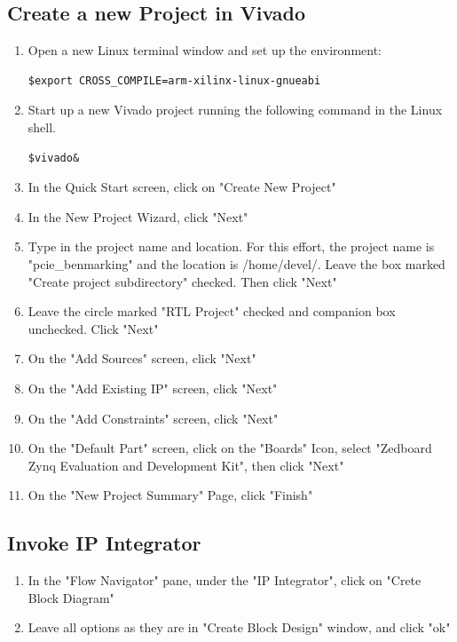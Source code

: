 \documentclass[12pt]{article}
\begin{document}
\subsection{Create a new Project in Vivado} \label{subsec:new project}
\begin{enumerate} 
\item Open a new Linux terminal window and set up the environment:
\begin{lstlisting}
$export CROSS_COMPILE=arm-xilinx-linux-gnueabi
\end{lstlisting}
\item Start up a new Vivado project running the following command in the Linux shell.

\begin{lstlisting}
$vivado&
\end{lstlisting}

\item In the Quick Start screen, click on "Create New Project"
\item In the New Project Wizard, click "Next"
\item Type in the project name and location.  For this effort, the project name is "pcie\_benmarking" and the location is /home/devel/.  Leave the box marked "Create project subdirectory" checked.  Then click "Next"\label{itm:project name}
\item Leave the circle marked "RTL Project" checked and companion box unchecked.  Click "Next"
\item On the "Add Sources" screen, click "Next" %
\item On the "Add Existing IP" screen, click "Next"
\item On the "Add Constraints" screen, click "Next"
\item On the "Default Part" screen, click on the "Boards" Icon, select "Zedboard Zynq Evaluation and Development Kit", then click "Next"
\item On the "New Project Summary" Page, click "Finish"
\end{enumerate}

\subsection{Invoke IP Integrator}
\begin{enumerate}
\item In the "Flow Navigator" pane, under the "IP Integrator", click on "Crete Block Diagram"
\item Leave all options as they are in "Create Block Design" window, and click "ok"
\end{enumerate}
\end{document}
